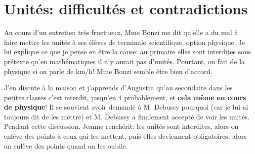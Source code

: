 \section{Unités: difficultés et contradictions}
Au cours d'un entretien très fructueux, Mme Bonzi me dit qu'elle a du mal à faire mettre les unités à ses élèves de terminale scientifique, option physique. Je lui explique ce que je pense en être la cause: au primaire elles sont interdites sous prétexte qu'en mathématiques il n'y aurait pas d'unités. Pourtant, on fait de la physique si on parle de km/h! Mme Bonzi semble être bien d'accord. 

J'en discute à la maison et j'apprends d'Augustin qu'au secondaire dans les petites classes c'est interdit, jusqu'en 4\ieme{} probablement, et \textbf{cela même en cours de physique}! Il se souvient avoir demandé à M. Debussy pourquoi (car je lui ai toujours dit de les mettre) et M. Debussy a finalement accepté de voir les unités. Pendant cette discussion, Jeanne renchérit: les unités sont interdites, alors on enlève des points à ceux qui les mettent, puis elles deviennent obligatoires, alors on enlève des points quand on les oublie.
